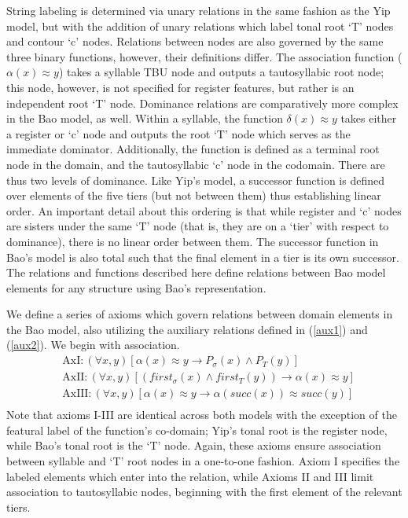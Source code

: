 \documentclass{article}
\newcommand{\ap}{\approx}
\newcommand{\all}{\forall}
\begin{document}
String labeling is determined via unary relations in the same fashion as the Yip model, but with the addition of unary relations which label tonal root `T' nodes and contour `c' nodes. Relations between nodes are also governed by the same three binary functions, however, their definitions differ. The association function ($\alpha(x)\ap y$) takes a syllable TBU node and outputs a tautosyllabic root node; this node, however, is not specified for register features, but rather is an independent root `T' node. Dominance relations are comparatively more complex in the Bao model, as well. Within a syllable, the function $\delta(x)\ap y$ takes either a register or `c' node and outputs the root `T' node which serves as the immediate dominator. Additionally, the function is defined as a terminal root node in the domain, and the tautosyllabic `c' node in the codomain. There are thus two levels of dominance. Like Yip's model, a successor function is defined over elements of the five tiers (but not between them) thus establishing linear order. An important detail about this ordering is that while register and `c' nodes are sisters under the same `T' node (that is, they are on a `tier' with respect to dominance), there is no linear order between them. The successor function in Bao's model is also total such that the final element in a tier is its own successor. The relations and functions described here define relations between Bao model elements for any structure using Bao's representation. \par
We define a series of axioms which govern relations between domain elements in the Bao model, also utilizing the auxiliary relations defined in (\ref{aux1}) and (\ref{aux2}). We begin with association.
\begin{equation}
\begin{aligned}
&\text{AxI:}\,(\all x,y)[\alpha(x)\ap y \rightarrow P_{\sigma}(x)\land P_{T}(y)]\\
&\text{AxII:}\,(\all x,y)[(first_{\sigma}(x)\land first_{T}(y))\rightarrow\alpha(x)\ap y]\\
&\text{AxIII:}\,(\all x,y)[\alpha(x) \ap y \rightarrow \alpha(succ(x))\ap succ(y)] \\
\end{aligned}
\end{equation}
Note that axioms I-III are identical across both models with the exception of the featural label of the function's co-domain; Yip's tonal root is the register node, while Bao's tonal root is the `T' node. Again, these axioms ensure association between syllable and `T' root nodes in a one-to-one fashion. Axiom I specifies the labeled elements which enter into the relation, while Axioms II and III limit association to tautosyllabic nodes, beginning with the first element of the relevant tiers. \par
\end{document}
